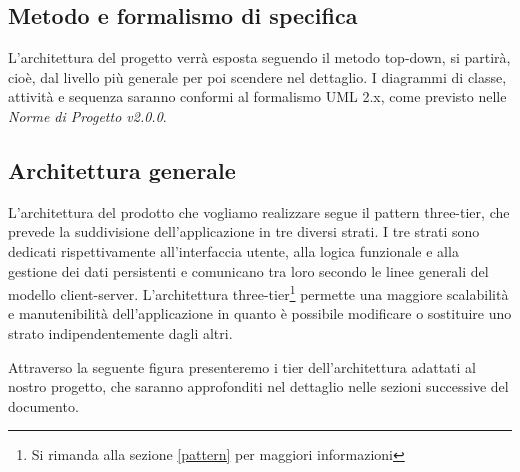 \subsection{Metodo e formalismo di specifica}
L'architettura del progetto verrà esposta seguendo il metodo \gls{top-down}, si partirà, cioè, dal livello più generale per poi scendere nel dettaglio. I diagrammi di classe, attività e sequenza saranno conformi al formalismo \gls{UML} 2.x, come previsto nelle \textit{Norme di Progetto v2.0.0}.

\subsection{Architettura generale}
L'architettura del prodotto che vogliamo realizzare segue il pattern three-tier, che prevede la suddivisione dell'applicazione in tre diversi strati. I tre strati sono dedicati rispettivamente all'interfaccia utente, alla logica funzionale e alla gestione dei dati persistenti e comunicano tra loro secondo le linee generali del modello client-server. L'architettura three-tier\footnote{Si rimanda alla sezione \ref{pattern} per maggiori informazioni} permette una maggiore scalabilità e manutenibilità dell'applicazione in quanto è possibile modificare o sostituire uno strato indipendentemente dagli altri.

Attraverso la seguente figura presenteremo i tier dell'architettura adattati al nostro progetto, che saranno approfonditi nel dettaglio nelle sezioni successive del documento.

